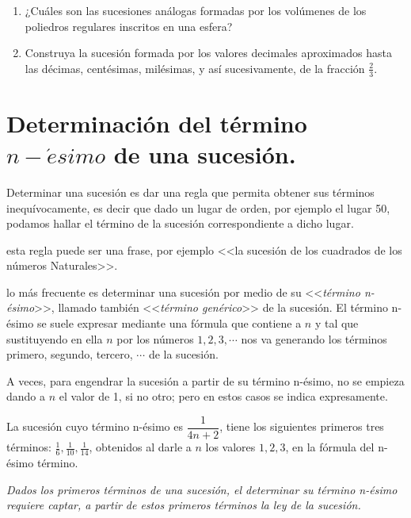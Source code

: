 \begin{ejercicios}[]
\begin{enumerate}
\item ¿Cuáles son las sucesiones análogas formadas por los volúmenes de
los poliedros regulares inscritos en una esfera?
\item Construya la sucesión formada por los valores decimales aproximados
hasta las décimas, centésimas, milésimas, y así sucesivamente, de
la fracción $\frac{2}{3}$.
\end{enumerate}
\end{ejercicios}

\section{Determinación del término $n-\acute{e}simo$ de una sucesión.}

Determinar una sucesión es dar una regla que permita obtener sus términos
inequívocamente, es decir que dado un lugar de orden, por ejemplo
el lugar 50, podamos hallar el término de la sucesión correspondiente
a dicho lugar.

esta regla puede ser una frase, por ejemplo <<la sucesión de los
cuadrados de los números Naturales>>.

lo más frecuente es determinar una sucesión por medio de su <<\textsl{término
n-ésimo}>>, llamado también <<\textsl{término genérico}>> de la
sucesión. El término n-ésimo se suele expresar mediante una fórmula
que contiene a $n$ y tal que sustituyendo en ella $n$ por los números
$1,2,3,\cdots$ nos va generando los términos primero, segundo, tercero,
$\cdots$ de la sucesión.

A veces, para engendrar la sucesión a partir de su término n-ésimo,
no se empieza dando a $n$ el valor de 1, si no otro; pero en estos
casos se indica expresamente.

\begin{ejemplo}

La sucesión cuyo término n-ésimo es $\dfrac{1}{4n+2}$, tiene los
siguientes primeros tres términos: $\frac{1}{6},\frac{1}{10},\frac{1}{14}$,
obtenidos al darle a $n$ los valores $1,2,3$, en la fórmula del
n-ésimo término. 

\end{ejemplo}

\textsl{\small{}Dados los primeros términos de una sucesión, el determinar
su término n-ésimo requiere captar, a partir de estos primeros términos
la ley de la sucesión.}{\small \par}


